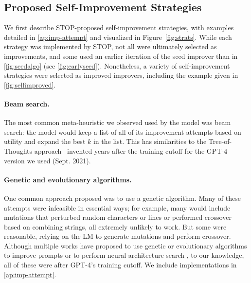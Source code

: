 \documentclass{article} %
\begin{document}
%
\subsection{Proposed Self-Improvement Strategies}
%
We first describe STOP-proposed self-improvement strategies, with examples detailed in \cref{ap:imp-attempt} and visualized in Figure~\ref{fig:strats}. 
%
While each strategy was implemented by STOP, not all were ultimately selected as improvements, and some used an earlier iteration of the seed improver than in \cref{fig:seedalgo} (see \cref{fig:earlyseed}). Nonetheless, a variety of self-improvement strategies were selected as improved improvers, including the example given in \cref{fig:selfimproved}.  \vspace{-1.6px}

\paragraph{Beam search.} The most common meta-heuristic we observed used by the model was beam search: the model would keep a list of all of its improvement attempts based on utility and expand the best $k$ in the list. This has similarities to the Tree-of-Thoughts approach~\citep{yao2023tree} invented years after the training cutoff for the GPT-4 version we used (Sept. 2021).
\vspace{-1.6px}

\paragraph{Genetic and evolutionary algorithms.} One common approach proposed was to use a genetic algorithm. Many of these attempts were infeasible in essential ways; for example, many would include mutations that perturbed random characters or lines or performed crossover based on combining strings, all extremely unlikely to work. But some were reasonable, relying on the LM to generate mutations and perform crossover. Although multiple works have proposed to use genetic or evolutionary algorithms to improve prompts or to perform neural architecture search \citep{chen2023evoprompting,guo2023connecting}, to our knowledge, all of these were after GPT-4's training cutoff. We include implementations in \cref{ap:imp-attempt}. \vspace{-1.6px}
\end{document}
